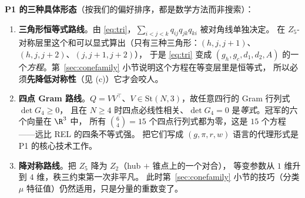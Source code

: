 \textbf{P1 的三种具体形态}（按我们的偏好排序，都是数学方法而非搜索）：
\begin{enumerate}[label=(\alph*),leftmargin=2.2em]
\item \textbf{三角形恒等式路线}。由 \eqref{eq:tri}，$\sum_{i<j<k}q_{ij}q_{jk}q_{ki}$ 被对角线单独决定。
在 $Z_5$-对称层里这个和可以显式算出（只有三种三角形：$(h,j,j{+}1)$、$(h,j,j{+}2)$、$(j,j{+}1,j{+}2)$），
于是 \eqref{eq:tri} 变成 $(g_h,g_c,d_1,d_2,A)$ 的一个\emph{方程}。第~\ref{sec:conefamily} 小节说明这个方程在等变层里是恒等式，
所以必须\textbf{先降低对称性}（见 (c)）它才会咬人。
\item \textbf{四点 Gram 路线}。$Q=VV^\top$、$V\in\mathrm{St}(N,3)$，故任意四行的 Gram 行列式 $\det G_4\ge0$，
且在 $N\ge4$ 时四点必线性相关、$\det G_4=0$ 是\emph{等式}。冠军的六个向量在 $\R^3$ 中，
所有 $\binom64=15$ 个四点行列式都为零，这是 $15$ 个方程——远比 REL 的四条不等式强。
把它们写成 $(g,\pi,r,w)$ 语言的代理形式是 P1 的核心技术工作。
\item \textbf{降对称路线}。把 $Z_5$ 降为 $Z_2$（hub $+$ 锥点上的一个对合），
等变参数从 $1$ 维升到 $4$ 维，秩三约束第一次非平凡。
此时第~\ref{sec:conefamily} 小节的技巧（分类 $\mu$ 特征值）仍然适用，只是分量的重数变了。
\end{enumerate}
